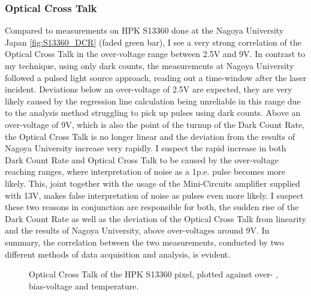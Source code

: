 \documentclass[article,type=msc,colorback,accentcolor=tud9c]{tudthesis}
\begin{document}
\subsubsection{Optical Cross Talk}
Compared to measurements on HPK S13360 done at the Nagoya University Japan \ref{fig:S13360_DCR} (faded green bar), I see a very strong correlation of the Optical Cross Talk in the over-voltage range between 2.5V and 9V. In contrast to my technique, using only dark counts, the measurements at Nagoya University followed a pulsed light source approach, reading out a time-window after the laser incident. Deviations below an over-voltage of 2.5V are expected, they are very likely caused by the regression line calculation being unreliable in this range due to the analysis method struggling to pick up pulses using dark counts. Above an over-voltage of 9V, which is also the point of the turnup of the Dark Count Rate, the Optical Cross Talk is no longer linear and the deviation from the results of Nagoya University increase very rapidly. I suspect the rapid increase in both Dark Count Rate and Optical Cross Talk to be caused by the over-voltage reaching ranges, where interpretation of noise as a 1p.e. pulse becomes more likely. This, joint together with the usage of the Mini-Circuits amplifier supplied with 13V, makes false interpretation of noise as pulses even more likely. I suspect these two reasons in conjunction are responsible for both, the sudden rise of the Dark Count Rate as well as the deviation of the Optical Cross Talk from linearity and the results of Nagoya University, above over-voltages around 9V. In summary, the correlation between the two measurements, conducted by two different methods of data acquisition and analysis, is evident.

\begin{figure}[h]
\begin{centering}
\caption{Optical Cross Talk of the HPK S13360 pixel, plotted against over- , bias-voltage and temperature. }
\label{fig:S13360_OCT}
\end{centering}
\end{figure}
\end{document}
